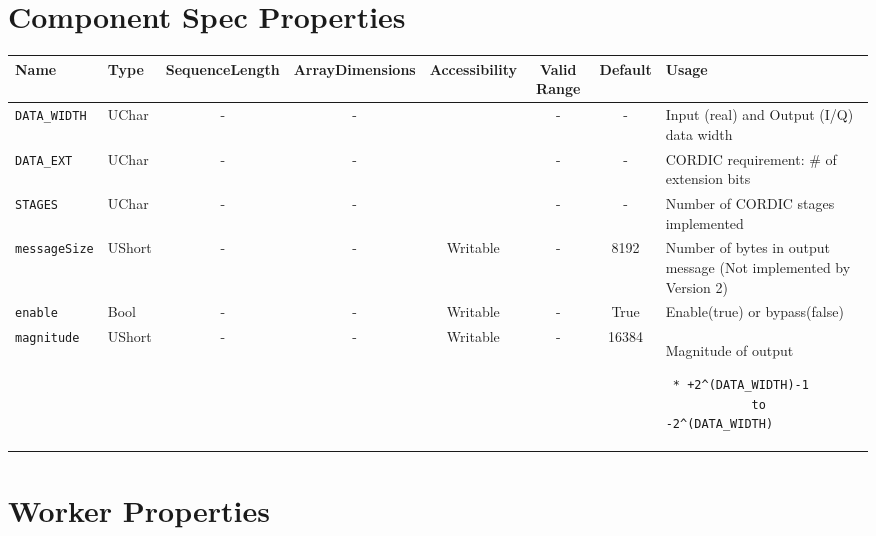 \begin{landscape}
\section*{Component Spec Properties}
\begin{scriptsize}
	\begin{tabular}{|p{3cm}|p{1.5cm}|c|c|c|c|c|p{7cm}|}
		\hline
		\rowcolor{blue}
		Name               & Type   & SequenceLength & ArrayDimensions & Accessibility      & Valid Range & Default & Usage                                                               \\
		\hline
		\verb+DATA_WIDTH+  & UChar  & -              & -               &          & -           & -       & Input (real) and Output (I/Q) data width                            \\
		\hline
		\verb+DATA_EXT+    & UChar  & -              & -               &          & -           & -       & CORDIC requirement: \# of extension bits                            \\
		\hline
		\verb+STAGES+      & UChar  & -              & -               &          & -           & -       & Number of CORDIC stages implemented                                 \\
		\hline
		\verb+messageSize+ & UShort & -              & -               & Writable & -           & 8192    & Number of bytes in output message (Not implemented by Version 2) \\
		\hline
		\verb+enable+      & Bool   & -              & -               & Writable & -           & True    & Enable(true) or bypass(false)                                       \\
		\hline
		\verb+magnitude+   & UShort & -              & -               & Writable & -           & 16384   & Magnitude of output \scriptsize\begin{verbatim} * +2^(DATA_WIDTH)-1
			to -2^(DATA_WIDTH)\end{verbatim}\\
		\hline
	\end{tabular}
\end{scriptsize}

\section*{Worker Properties}

\end{landscape}
